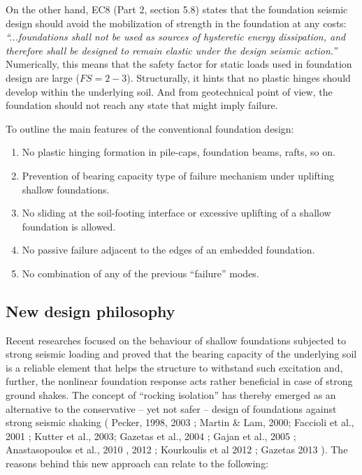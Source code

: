 \documentclass[12pt,a4paper]{report}
\begin{document}
On the other hand, EC8 (Part 2, section 5.8) \cite{code2005eurocode} states that the foundation seismic design should avoid the mobilization of strength in the foundation at any costs: \textit{“...foundations shall not be used as sources of hysteretic energy dissipation, and therefore shall be designed to remain elastic under the design seismic action.”} Numerically, this means that the safety factor for static loads used in foundation design are large ($FS=2-3$). Structurally, it hints that no plastic hinges should develop within the underlying soil. And from geotechnical point of view, the foundation should not reach any state that might imply failure. 

To outline the main features of the conventional foundation design:
\begin{enumerate}
	\item  No plastic hinging formation in pile-caps, foundation beams, rafts, so on.
	\item Prevention of bearing capacity type of failure mechanism under uplifting shallow foundations.
	\item No sliding at the soil-footing interface or excessive uplifting of a shallow foundation is allowed.
	\item No passive failure adjacent to the edges of an embedded foundation.
	\item No combination of any of the previous “failure” modes.
\end{enumerate}

\subsection{New design philosophy}
Recent researches focused on the behaviour of shallow foundations subjected to strong seismic loading and proved that the bearing capacity of the underlying soil is a reliable element that helps the structure to withstand such excitation and, further, the nonlinear foundation response acts rather beneficial in case of strong ground shakes. The concept of “rocking isolation” has thereby emerged as an alternative to the conservative – yet not safer – design of foundations against strong seismic shaking ( Pecker, 1998, 2003 \cite{pecker2014role}; Martin \& Lam, 2000; Faccioli et al., 2001 \cite{faccioli2001investigation}; Kutter et al., 2003; Gazetas et al., 2004 \cite{gazetas2004seismic}; Gajan et al., 2005 \cite{gajan2005centrifuge}; Anastasopoulos et al., 2010 \cite{anastasopoulos2010soil}, 2012 \cite{anastasopoulos2011simplified}; Kourkoulis et al 2012 \cite{kourkoulis2012rocking}; Gazetas 2013 \cite{gazetas2013nonlinear}). The reasons behind this new approach can relate to the following:
\end{document}
